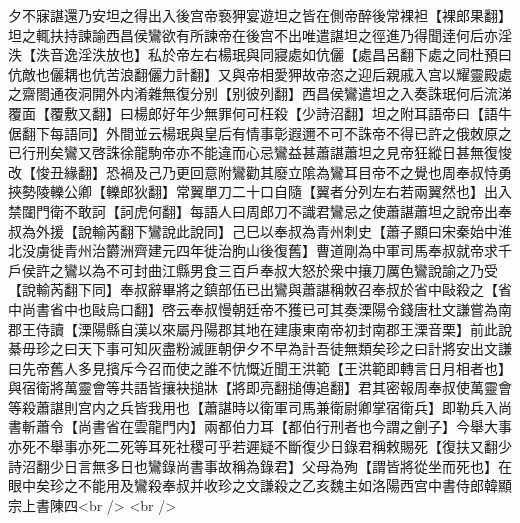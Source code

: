 夕不寐諶還乃安坦之得出入後宫帝䙝狎宴遊坦之皆在側帝醉後常裸袒【裸郎果翻】坦之輒扶持諫諭西昌侯鸞欲有所諫帝在後宫不出唯遣諶坦之徑進乃得聞逹何后亦淫泆【泆音逸淫泆放也】私於帝左右楊珉與同寢處如伉儷【處昌呂翻下處之同杜預曰伉敵也儷耦也伉苦浪翻儷力計翻】又與帝相愛狎故帝恣之迎后親戚入宫以耀靈殿處之齋閤通夜洞開外内淆雜無復分别【别彼列翻】西昌侯鸞遣坦之入奏誅珉何后流涕覆面【覆敷又翻】曰楊郎好年少無罪何可枉殺【少詩沼翻】坦之附耳語帝曰【語牛倨翻下每語同】外間並云楊珉與皇后有情事彰遐邇不可不誅帝不得已許之俄敇原之已行刑矣鸞又啓誅徐龍駒帝亦不能違而心忌鸞益甚蕭諶蕭坦之見帝狂縱日甚無復悛改【悛丑緣翻】恐禍及己乃更回意附鸞勸其廢立隂為鸞耳目帝不之覺也周奉叔恃勇挾勢陵轢公卿【轢郎狄翻】常翼單刀二十口自隨【翼者分列左右若兩翼然也】出入禁闥門衛不敢訶【訶虎何翻】每語人曰周郎刀不識君鸞忌之使蕭諶蕭坦之說帝出奉叔為外援【說輸芮翻下鸞說此說同】己巳以奉叔為青州刺史【蕭子顯曰宋秦始中淮北没虜徙青州治欝洲齊建元四年徙治胊山後復舊】曹道剛為中軍司馬奉叔就帝求千戶侯許之鸞以為不可封曲江縣男食三百戶奉叔大怒於衆中攘刀厲色鸞說諭之乃受【說輸芮翻下同】奉叔辭畢將之鎮部伍已出鸞與蕭諶稱敇召奉叔於省中敺殺之【省中尚書省中也敺烏口翻】啓云奉叔慢朝廷帝不獲已可其奏溧陽令錢唐杜文謙嘗為南郡王侍讀【溧陽縣自漢以來屬丹陽郡其地在建康東南帝初封南郡王溧音栗】前此說綦毋珍之曰天下事可知灰盡粉滅匪朝伊夕不早為計吾徒無類矣珍之曰計將安出文謙曰先帝舊人多見擯斥今召而使之誰不忼慨近聞王洪範【王洪範即轉言日月相者也】與宿衛將萬靈會等共語皆攘袂搥牀【將即亮翻搥傳追翻】君其密報周奉叔使萬靈會等殺蕭諶則宫内之兵皆我用也【蕭諶時以衛軍司馬兼衛尉卿掌宿衛兵】即勒兵入尚書斬蕭令【尚書省在雲龍門内】兩都伯力耳【都伯行刑者也今謂之劊子】今舉大事亦死不舉事亦死二死等耳死社稷可乎若遲疑不斷復少日錄君稱敕賜死【復扶又翻少詩沼翻少日言無多日也鸞錄尚書事故稱為錄君】父母為殉【謂皆將從坐而死也】在眼中矣珍之不能用及鸞殺奉叔并收珍之文謙殺之乙亥魏主如洛陽西宫中書侍郎韓顯宗上書陳四<br />
<br />
